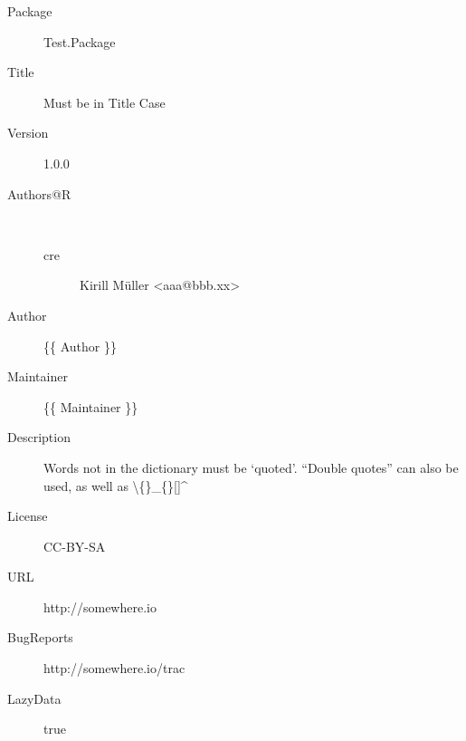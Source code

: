 \begin{description}
  \raggedright{}
  \item[Package] Test.Package
  \item[Title] Must be in Title Case
  \item[Version] 1.0.0
  \item[Authors@R] \\
    \begin{description}
      \item[cre] Kirill Müller <aaa@bbb.xx>
    \end{description}
  \item[Author] \{\{ Author \}\}
  \item[Maintainer] \{\{ Maintainer \}\}
  \item[Description] Words not in the dictionary must be `quoted'. ``Double quotes'' can also be used, as well as \textbackslash\{\}\_\{\}[]^%
  \item[License] CC-BY-SA
  \item[URL] http://somewhere.io
  \item[BugReports] http://somewhere.io/trac
  \item[LazyData] true
\end{description}

